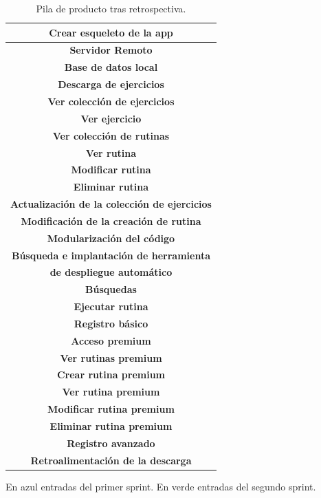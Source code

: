 \documentclass[11pt,a4paper]{report}
\begin{document}
\begin{table}[H]
	\centering
	\label{tab2}
	\begin{tabular}{|c|}
		\hline
		\rowcolor[HTML]{BBDAFF}
		\textbf{Crear esqueleto de la app}  \\ \hline
		\rowcolor[HTML]{BBDAFF}
		\textbf{Servidor Remoto}  \\ \hline
		\rowcolor[HTML]{BBDAFF}
		\textbf{Base de datos local}  \\ \hline
		\rowcolor[HTML]{BBDAFF}
		\textbf{Descarga de ejercicios}  \\ \hline
		\rowcolor[HTML]{BBDAFF}
		\textbf{Ver colección de ejercicios}  \\ \hline
		\rowcolor[HTML]{BBDAFF}
		\textbf{Ver ejercicio}  \\ \hline
		\rowcolor[HTML]{BBDAFF}
		\textbf{Ver colección de rutinas}  \\ \hline
		\rowcolor[HTML]{BBDAFF}
		\textbf{Ver rutina}  \\ \hline
		\rowcolor[HTML]{BBDAFF}
		\textbf{Modificar rutina}  \\ \hline
		\rowcolor[HTML]{BBDAFF}
		\textbf{Eliminar rutina}  \\ \hline
		\rowcolor[HTML]{9AFF99}
		\textbf{Actualización de la colección de ejercicios}  \\ \hline
		\rowcolor[HTML]{9AFF99}
		\textbf{Modificación de la creación de rutina}  \\ \hline
		\rowcolor[HTML]{9AFF99}
		\textbf{Modularización del código}  \\ \hline
		\rowcolor[HTML]{9AFF99}
		\textbf{Búsqueda e implantación de herramienta}\\
		\rowcolor[HTML]{9AFF99}
		\textbf{de despliegue automático }\\ \hline
		\rowcolor[HTML]{9AFF99}
		\textbf{Búsquedas}  \\ \hline
		\rowcolor[HTML]{9AFF99}
		\textbf{Ejecutar rutina}  \\ \hline
		\rowcolor[HTML]{9AFF99}
		\textbf{Registro básico}  \\ \hline
		\rowcolor[HTML]{9AFF99}
		\textbf{Acceso premium}  \\ \hline
		\rowcolor[HTML]{9AFF99}
		\textbf{Ver rutinas premium}  \\ \hline
		\rowcolor[HTML]{9AFF99}
		\textbf{Crear rutina premium}  \\ \hline
		\rowcolor[HTML]{9AFF99}
		\textbf{Ver rutina premium}  \\ \hline
		\rowcolor[HTML]{9AFF99}
		\textbf{Modificar rutina premium}  \\ \hline
		\rowcolor[HTML]{9AFF99}
		\textbf{Eliminar rutina premium}  \\ \hline
		\rowcolor[HTML]{9AFF99}
		\textbf{Registro avanzado}  \\ \hline
		\rowcolor[HTML]{9AFF99}
		\textbf{Retroalimentación de la descarga}  \\ \hline
	\end{tabular}
	\caption{Pila de producto tras retrospectiva.}         
\end{table}
En azul entradas del primer sprint. En verde entradas del segundo sprint.
\end{document}
